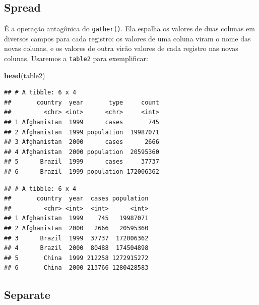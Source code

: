 \documentclass[]{book}
\newenvironment{Shaded}{\begin{snugshade}}{\end{snugshade}}
\newcommand{\KeywordTok}[1]{\textcolor[rgb]{0.13,0.29,0.53}{\textbf{#1}}}
\newcommand{\DataTypeTok}[1]{\textcolor[rgb]{0.13,0.29,0.53}{#1}}
\newcommand{\StringTok}[1]{\textcolor[rgb]{0.31,0.60,0.02}{#1}}
\newcommand{\OperatorTok}[1]{\textcolor[rgb]{0.81,0.36,0.00}{\textbf{#1}}}
\newcommand{\NormalTok}[1]{#1}
\begin{document}
\subsection{Spread}\label{spread}

É a operação antagônica do \texttt{gather()}. Ela espalha os valores de
duas colunas em diversos campos para cada registro: os valores de uma
coluna viram o nome das novas colunas, e os valores de outra virão
valores de cada registro nas novas colunas. Usaremos a \texttt{table2}
para exemplificar:

\begin{Shaded}
\begin{Highlighting}[]
\KeywordTok{head}\NormalTok{(table2)}
\end{Highlighting}
\end{Shaded}

\begin{verbatim}
## # A tibble: 6 x 4
##       country  year       type     count
##         <chr> <int>      <chr>     <int>
## 1 Afghanistan  1999      cases       745
## 2 Afghanistan  1999 population  19987071
## 3 Afghanistan  2000      cases      2666
## 4 Afghanistan  2000 population  20595360
## 5      Brazil  1999      cases     37737
## 6      Brazil  1999 population 172006362
\end{verbatim}

\begin{Shaded}
\end{Shaded}

\begin{verbatim}
## # A tibble: 6 x 4
##       country  year  cases population
##         <chr> <int>  <int>      <int>
## 1 Afghanistan  1999    745   19987071
## 2 Afghanistan  2000   2666   20595360
## 3      Brazil  1999  37737  172006362
## 4      Brazil  2000  80488  174504898
## 5       China  1999 212258 1272915272
## 6       China  2000 213766 1280428583
\end{verbatim}

\subsection{Separate}\label{separate}
\end{document}
